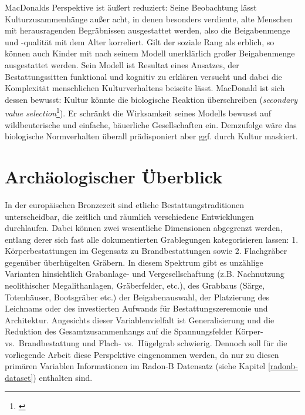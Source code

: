 \documentclass[openany,twoside,twocolumn]{book}
\let\rmarkdownfootnote\footnote%
\def\footnote{\protect\rmarkdownfootnote}
\begin{document}
MacDonalds Perspektive ist äußert reduziert: Seine Beobachtung lässt
Kulturzusammenhänge außer acht, in denen besonders verdiente, alte
Menschen mit herausragenden Begräbnissen ausgestattet werden, also die
Beigabenmenge und -qualität mit dem Alter korreliert. Gilt der soziale
Rang als erblich, so können auch Kinder mit nach seinem Modell
unerklärlich großer Beigabenmenge ausgestattet werden. Sein Modell ist
Resultat eines Ansatzes, der Bestattungssitten funktional und kognitiv
zu erklären versucht und dabei die Komplexität menschlichen
Kulturverhaltens beiseite lässt. MacDonald ist sich dessen bewusst:
Kultur könnte die biologische Reaktion überschreiben (\emph{secondary
value selection}\footnote{\textcite{durham_coevolution_1991-1}}). Er
schränkt die Wirksamkeit seines Modells bewusst auf wildbeuterische und
einfache, bäuerliche Gesellschaften ein. Demzufolge wäre das biologische
Normverhalten überall prädisponiert aber ggf. durch Kultur maskiert.

\hypertarget{regions-archaeological-overview}{%
\section{Archäologischer
Überblick}\label{regions-archaeological-overview}}

In der europäischen Bronzezeit sind etliche Bestattungstraditionen
unterscheidbar, die zeitlich und räumlich verschiedene Entwicklungen
durchlaufen. Dabei können zwei wesentliche Dimensionen abgegrenzt
werden, entlang derer sich fast alle dokumentierten Grablegungen
kategorisieren lassen: 1. Körperbestattungen im Gegensatz zu
Brandbestattungen sowie 2. Flachgräber gegenüber überhügelten Gräbern.
In diesem Spektrum gibt es unzählige Varianten hinsichtlich Grabanlage-
und Vergesellschaftung (z.B. Nachnutzung neolithischer Megalithanlagen,
Gräberfelder, etc.), des Grabbaus (Särge, Totenhäuser, Bootsgräber etc.)
der Beigabenauswahl, der Platzierung des Leichnams oder des investierten
Aufwands für Bestattungszeremonie und Architektur. Angesichts dieser
Variablenvielfalt ist Generalisierung und die Reduktion des
Gesamtzusammenhangs auf die Spannungsfelder Körper- vs.~Brandbestattung
und Flach- vs.~Hügelgrab schwierig. Dennoch soll für die vorliegende
Arbeit diese Perspektive eingenommen werden, da nur zu diesen primären
Variablen Informationen im Radon-B Datensatz (siehe Kapitel
\ref{radonb-dataset}) enthalten sind.
\end{document}
